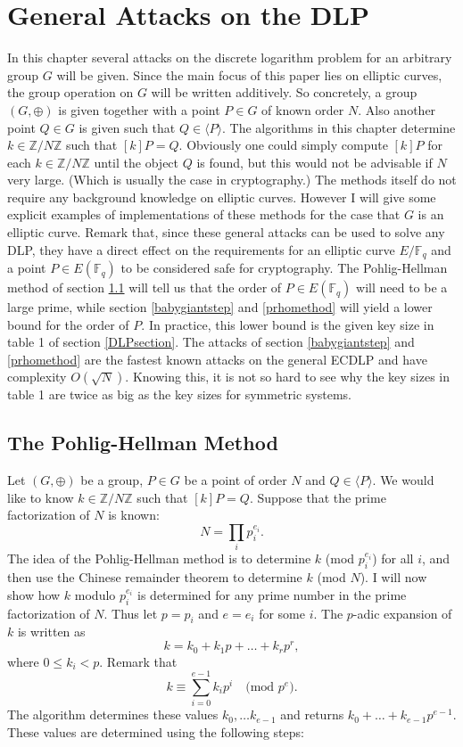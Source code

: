 \documentclass{article}
\numberwithin{equation}{section}
\theoremstyle{definition}
\newcommand{\ZZ}{{\mathbb Z}} %
\newcommand{\Zmod}[1]{\ZZ / #1\ZZ} %
\newcommand{\FF}[1]{{\mathbb F}_{#1}} %
\newcommand{\grgen}[1]{\langle #1 \rangle} %
\begin{document}
\section{General Attacks on the DLP}\label{generalattacksonDLP}
In this chapter several attacks on the discrete logarithm problem for an arbitrary group $G$ will be given. Since the main focus of this paper lies on elliptic curves, the group operation on $G$ will be written additively. So concretely, a group $(G,\oplus)$ is given together with a point $P \in G$ of known order $N$. Also another point $Q\in G$ is given such that $Q \in \grgen{P}$. The algorithms in this chapter determine $k \in \Zmod{N}$ such that $[k]P = Q$. Obviously one could simply compute $[k]P$ for each $k \in \Zmod{N}$ until the object $Q$ is found, but this would not be advisable if $N$ very large. (Which is usually the case in cryptography.) The methods itself do not require any background knowledge on elliptic curves. However I will give some explicit examples of implementations of these methods for the case that $G$ is an elliptic curve. Remark that, since these general attacks can be used to solve any DLP, they have a direct effect on the requirements for an elliptic curve $E/\FF{q}$ and a point $P\in E(\FF{q})$ to be considered safe for cryptography. The Pohlig-Hellman method of section \ref{Pohlig-Hellman} will tell us that the order of $P\in E(\FF{q})$ will need to be a large prime, while section \ref{babygiantstep} and \ref{prhomethod} will yield a lower bound for the order of $P$. In practice, this lower bound is the given key size in table 1 of section \ref{DLPsection}. The attacks of section \ref{babygiantstep} and \ref{prhomethod} are the fastest known attacks on the general ECDLP and have complexity $O(\sqrt{N})$. Knowing this, it is not so hard to see why the key sizes in table 1 are twice as big as the key sizes for symmetric systems. 


\subsection{The Pohlig-Hellman Method}\label{Pohlig-Hellman}
Let $(G,\oplus)$ be a group, $P \in G$ be a point of order $N$ and $Q \in \grgen{P}$. We would like to know $k \in \Zmod{N}$ such that $[k]P=Q$. Suppose that the prime factorization of $N$ is known: $$N =\prod_i p_i^{e_i}.$$ The idea of the Pohlig-Hellman method is to determine $ k$ (mod $p_i^{e_i}$) for all $i$, and then use the Chinese remainder theorem to determine $k$ (mod $N$). I will now show how $k$ modulo $p_i^{e_i}$ is determined for any prime number in the prime factorization of $N$. Thus let $p=p_i$ and $e=e_i$ for some $i$. The $p$-adic expansion of $k$ is written as $$k=k_0+k_1p+ \ldots + k_rp^r,$$ where $0 \leq k_i < p$. Remark that \begin{equation}\label{padick}k \equiv \sum_{i=0}^{e-1} k_ip^i \quad \text{(mod } p^e).\end{equation} The algorithm determines these values $k_0,\ldots k_{e-1}$ and returns $k_0+\ldots + k_{e-1} p ^{e-1}$. These values are determined using the following steps:
\end{document}

